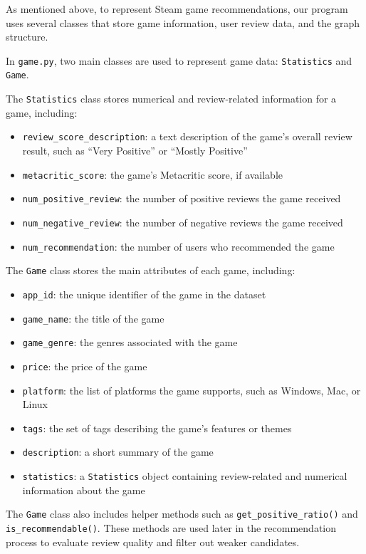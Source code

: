 \documentclass[fontsize=11pt]{article}
\begin{document}
As mentioned above, to represent Steam game recommendations, our program uses several classes that store game information, user review data, and the graph structure.

In \texttt{game.py}, two main classes are used to represent game data: \texttt{Statistics} and \texttt{Game}.

The \texttt{Statistics} class stores numerical and review-related information for a game, including:
\begin{itemize}
    \item \texttt{review\_score\_description}: a text description of the game’s overall review result, such as ``Very Positive'' or ``Mostly Positive''
    \item \texttt{metacritic\_score}: the game’s Metacritic score, if available
    \item \texttt{num\_positive\_review}: the number of positive reviews the game received
    \item \texttt{num\_negative\_review}: the number of negative reviews the game received
    \item \texttt{num\_recommendation}: the number of users who recommended the game
\end{itemize}

The \texttt{Game} class stores the main attributes of each game, including:
\begin{itemize}
    \item \texttt{app\_id}: the unique identifier of the game in the dataset
    \item \texttt{game\_name}: the title of the game
    \item \texttt{game\_genre}: the genres associated with the game
    \item \texttt{price}: the price of the game
    \item \texttt{platform}: the list of platforms the game supports, such as Windows, Mac, or Linux
    \item \texttt{tags}: the set of tags describing the game’s features or themes
    \item \texttt{description}: a short summary of the game
    \item \texttt{statistics}: a \texttt{Statistics} object containing review-related and numerical information about the game
\end{itemize}

The \texttt{Game} class also includes helper methods such as \texttt{get\_positive\_ratio()} and \texttt{is\_recommendable()}. These methods are used later in the recommendation process to evaluate review quality and filter out weaker candidates.
\end{document}
